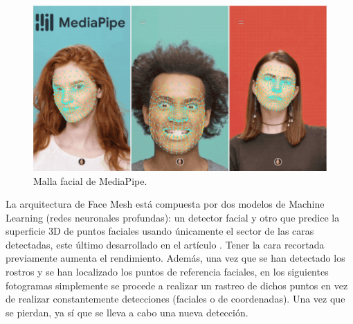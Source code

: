\begin{figure} [h!]
  \begin{center}
    \includegraphics[width=12cm]{figs/mediapipe.png}
  \end{center}
  \caption{Malla facial de MediaPipe.}
  \label{fig:mediapipe}
\end{figure}

La arquitectura de Face Mesh está compuesta por dos modelos de Machine Learning (redes neuronales profundas): un detector facial y otro que predice la superficie 3D de puntos faciales usando únicamente el sector de las caras detectadas, este último desarrollado en el artículo \cite{facemesh_surface}. Tener la cara recortada previamente aumenta el rendimiento. Además, una vez que se han detectado los rostros y se han localizado los puntos de referencia faciales, en los siguientes fotogramas simplemente se procede a realizar un rastreo de dichos puntos en vez de realizar constantemente detecciones (faciales o de coordenadas). Una vez que se pierdan, ya sí que se lleva a cabo una nueva detección.\\

